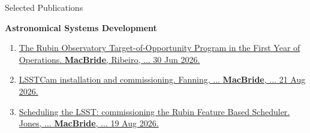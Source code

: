 \begin{rSection}{Selected Publications}
\begin{rSubsection}{\textbf{Astronomical Systems Development}}{}{}{}
\begin{enumerate}
    \item \href{https://arxiv.org/abs/2607.00217}{The Rubin Observatory Target-of-Opportunity Program in the First Year of Operations. \textbf{MacBride}, Ribeiro, ... 30 Jun 2026.}
    \item \href{https://www.spiedigitallibrary.org/conference-proceedings-of-spie/14147/1414714/LSSTCam-Installation-and-Commissioning-at-the-Vera-C-Rubin-Observatory/10.1117/12.3105731.short}{\ac{LSSTCam} installation and commissioning. Fanning, ... \textbf{MacBride}, ... 21 Aug 2026.}
    \item \href{https://www.spiedigitallibrary.org/conference-proceedings-of-spie/14151/141510X/Scheduling-the-LSST-commissioning-the-Rubin-feature-based-scheduler/10.1117/12.3104048.short}{Scheduling the LSST: commissioning the Rubin Feature Based Scheduler. Jones, ... \textbf{MacBride}, ... 19 Aug 2026.}
\end{enumerate}
\end{rSubsection}
\end{rSection}
